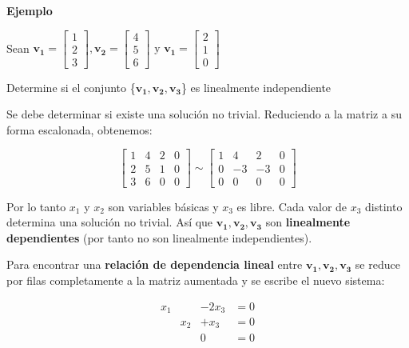 \documentclass{article}
\begin{document}
\begin{large}
    \textbf{Ejemplo}
\end{large}

Sean $\mathbf{v_1} = \begin{bmatrix} 1\\2\\3\end{bmatrix}, \mathbf{v_2} = \begin{bmatrix} 4\\5\\6 \end{bmatrix} \text{ y } \mathbf{v_1} = \begin{bmatrix} 2\\1\\0 \end{bmatrix}$

Determine si el conjunto \{$\mathbf{v_1},\mathbf{v_2}, \mathbf{v_3}$\} es linealmente independiente 

Se debe determinar si existe una solución no trivial. Reduciendo a la matriz a su forma escalonada, obtenemos:

\begin{equation*}
    \left[\begin{array}{rrr|r}
    1 & 4 & 2 & 0 \\
    2 & 5 & 1 & 0 \\
    3 & 6 & 0 & 0
    \end{array}\right] \sim\left[\begin{array}{rrr|r}
    1 & 4 & 2 & 0 \\
    0 & -3 & -3 & 0 \\
    0 & 0 & 0 & 0
    \end{array}\right]
\end{equation*}

Por lo tanto $x_1$ y $x_2$ son variables básicas y $x_3$ es libre. Cada valor de $x_3$ distinto determina una solución no trivial. Así que $\mathbf{v_1}, \mathbf{v_2}, \mathbf{v_3}$ son \textbf{linealmente dependientes} (por tanto no son linealmente independientes).

\pagebreak

Para encontrar una \textbf{relación de dependencia lineal} entre $\mathbf{v_1}, \mathbf{v_2}, \mathbf{v_3}$ se reduce por filas completamente a la matriz aumentada y se escribe el nuevo sistema:

\begin{equation*}
    \begin{aligned}
        x_1 & & -2x_3 &= 0\\
        & x_2 & +x_3 &=0\\
        & & 0 &= 0
    \end{aligned}
\end{equation*}
\end{document}
